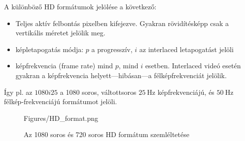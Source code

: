 \begin{itemize}
A különböző HD formátumok jelölése a következő:
\begin{itemize}
\item Teljes aktív felbontás pixelben kifejezve.
Gyakran rövidítésképp csak a vertikális méretet jelölik meg.
\item képletapogatás módja: $p$ a progresszív, $i$ az interlaced letapogatást jelöli
\item képfrekvencia (frame rate) mind $p$, mind $i$ esetben.
Interlaced videó esetén gyakran a képfrekvencia helyett---hibásan---a félképfrekvenciát jelölik.
\end{itemize}
Így pl. az $1080i25$ a 1080 soros, váltottsoros $25~\mathrm{Hz}$ képfrekvenciájú, és $50~\mathrm{Hz}$ félkép-frekvenciájú formátumot jelöli.
\begin{figure}[]
	\centering
	\begin{overpic}[width = 1 \columnwidth ]{Figures/HD_format.png}
	\small
	\end{overpic}
	\caption{Az 1080 soros és 720 soros HD formátum szemléltetése}
	\label{Fig:HD_formats}
\end{figure}


\end{itemize}
